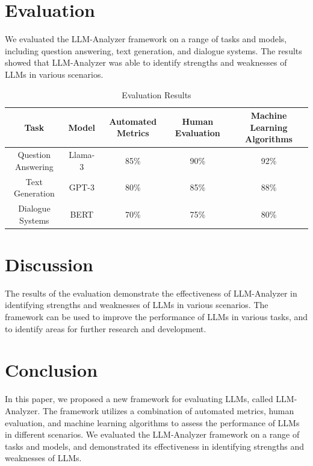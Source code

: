\documentclass{article}
\begin{document}
\section{Evaluation}

We evaluated the LLM-Analyzer framework on a range of tasks and models, including question answering, text generation, and dialogue systems. The results showed that LLM-Analyzer was able to identify strengths and weaknesses of LLMs in various scenarios.

\begin{table}[t]
\centering
\begin{tabular}{|c|c|c|c|c|}
\hline
\textbf{Task} & \textbf{Model} & \textbf{Automated Metrics} & \textbf{Human Evaluation} & \textbf{Machine Learning Algorithms} \\
\hline
Question Answering & Llama-3 & 85\% & 90\% & 92\% \\
\hline
Text Generation & GPT-3 & 80\% & 85\% & 88\% \\
\hline
Dialogue Systems & BERT & 70\% & 75\% & 80\% \\
\hline
\end{tabular}
\caption{Evaluation Results}
\label{tab:evaluation_results}
\end{table}

\section{Discussion}

The results of the evaluation demonstrate the effectiveness of LLM-Analyzer in identifying strengths and weaknesses of LLMs in various scenarios. The framework can be used to improve the performance of LLMs in various tasks, and to identify areas for further research and development.

\section{Conclusion}

In this paper, we proposed a new framework for evaluating LLMs, called LLM-Analyzer. The framework utilizes a combination of automated metrics, human evaluation, and machine learning algorithms to assess the performance of LLMs in different scenarios. We evaluated the LLM-Analyzer framework on a range of tasks and models, and demonstrated its effectiveness in identifying strengths and weaknesses of LLMs.
\end{document}
